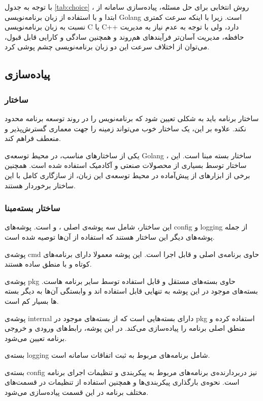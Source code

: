 با توجه به جدول
\ref{tab:choice}
، روش انتخابی برای حل مسئله،‌ پیاده‌سازی سامانه از ابتدا و با استفاده از زبان برنامه‌نویسی Golang است. زیرا با اینکه سرعت کمتری نسبت به زبان برنامه‌نویسی C یا C++ دارد، ولی با توجه به عدم نیاز به مدیریت حافظه، مدیریت آسان‌تر فرآیند‌های هم‌روند و همچنین سادگی و کارایی قابل قبول،‌ می‌توان از اختلاف سرعت این دو زبان برنامه‌نویسی چشم پوشی کرد.

\subsection{پیاده‌سازی}\label{subsec:impl_impl}

\subsubsection{ساختار}
ساختار برنامه‌ باید به شکلی تعیین شود که برنامه‌نویس را در روند توسعه برنامه محدود نکند. علاوه بر این، یک ساختار خوب می‌تواند زمینه را جهت معماری گسترش‌پذیر و منعطف فراهم کند.

یکی از ساختار‌های مناسب، در محیط توسعه‌ی Golang ، ساختار بسته مبنا است. این ساختار توسط بسیاری از محصولات صنعتی و آکادمیک استفاده شده است. همچنین برخی از ابزار‌های از پیش‌آماده در محیط توسعه‌ی این زبان، از سازگاری کامل با این ساختار برخوردار هستند.

\subsubsection{ساختار بسته‌مبنا}
این ساختار، شامل سه پوشه‌ی اصلی ،  و  است. پوشه‌های config و logging از جمله پوشه‌های دیگر این ساختار هستند که استفاده از آن‌ها توصیه شده است.

پوشه‌ی cmd حاوی برنامه‌ی اصلی و قابل اجرا است. این پوشه معمولا دارای برنامه‌های کوتاه و با منطق ساده هستند.

پوشه‌ی pkg حاوی بسته‌های مستقل و قابل استفاده توسط سایر برنامه هاست. بسته‌های موجود در این پوشه به تنهایی قابل استفاده اند و وابستگی آن‌ها به دیگر بسته ها بسیار کم است.

پوشه‌ی internal دارای بسته‌هایی است که از بسته‌های موجود در pkg استفاده کرده و منطق اصلی برنامه را پیاده‌سازی می‌کند. در این پوشه، رابط‌های ورودی و خروجی برنامه تعیین می‌شود.

بسته‌ی logging شامل برنامه‌های مربوط به ثبت اتفاقات سامانه است.

بسته‌ی config نیز دربردارنده‌ی برنامه‌های مربوط به پیکربندی و تنظیمات اجرای برنامه است. نحوه‌ی بارگذاری پیکربندی‌ها و همچنین استفاده از تنظیمات در قسمت‌های مختلف برنامه در این قسمت پیاده‌سازی می‌شود.


